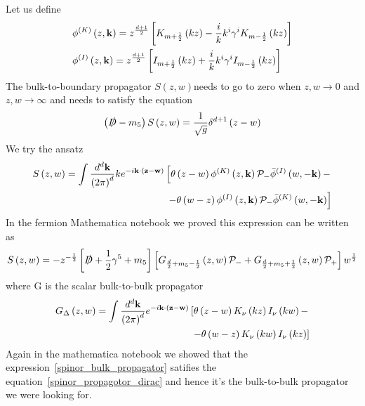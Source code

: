 \documentclass[12pt,a4paper]{article}
\begin{document}
Let us define 
\begin{align}
    &\phi^{\left( K \right)} \left(z, \mathbf{k} \right) = z^{\frac{d+1}{2}} \left[ K_{m+\frac{1}{2}} \left( k z \right) - \frac{i}{k} k^i \gamma^i K_{m-\frac{1}{2}} \left( k z \right)  \right] \\
    &\phi^{\left( I \right)} \left(z, \mathbf{k} \right) = z^{\frac{d+1}{2}} \left[ I_{m+\frac{1}{2}} \left( k z \right) + \frac{i}{k} k^i \gamma^i I_{m-\frac{1}{2}} \left( k z \right)  \right] \notag
\end{align}
The bulk-to-boundary propagator $ S \left(z, w \right) $needs to go to zero when $z, w \rightarrow 0$ and $z, w \rightarrow \infty $ and needs to satisfy the equation
\begin{align}
    \left(\slashed{D} - m_5\right) S\left(z,w\right) = \frac{1}{\sqrt{g}} \delta^{d+1} \left( z - w \right)
\label{spinor_propagotor_dirac}
\end{align}
We try the ansatz
\begin{align}
    S \left(z, w \right) = \int \frac{d^d \mathbf{k}}{{\left(2\pi\right)}^d} k e^{- i \mathbf{k}\cdot \left(\mathbf{z}-\mathbf{w}\right)} \left[ \theta \left( z - w \right)  \phi^{\left( K \right)} \left(z, \mathbf{k} \right) \mathcal{P}_{-} \bar{\phi}^{\left( I \right)} \left(w, -\mathbf{k} \right) - \right. \\  
    \left. - \theta\left( w - z \right) \phi^{\left( I \right)} \left(z, \mathbf{k} \right) \mathcal{P}_{-} \bar{\phi}^{\left( K \right)}\left(w, -\mathbf{k} \right) \right] \notag
\end{align}
In the fermion Mathematica notebook we proved this expression can be written as
\begin{align}
    S \left(z, w \right) = - z^{-\frac{1}{2}} \left[ \slashed{D} + \frac{1}{2}\gamma^5+ m_5 \right] \left[ G_{\frac{d}{2}+m_5 - \frac{1}{2}} \left(z,w\right) \mathcal{P}_{-} + G_{\frac{d}{2}+m_5 +\frac{1}{2}} \left(z,w\right) \mathcal{P}_{+}\right] w^{\frac{1}{2}}
\label{spinor_bulk_propagator}
\end{align}
where G is the scalar bulk-to-bulk propagator
\begin{align}
    G_{\Delta} \left(z, w \right) = \int \frac{d^d \mathbf{k}}{{\left(2\pi\right)}^d}  e^{- i \mathbf{k}\cdot \left(\mathbf{z}-\mathbf{w}\right)} \left[ \theta \left( z - w \right) K_{\nu} \left( k z \right) I_\nu \left( k w \right) - \right. \\  
    \left. - \theta\left( w - z \right) K_{\nu} \left( k w \right) I_\nu \left( k z \right) \right] \notag
\end{align}
Again in the mathematica notebook we showed that the expression~\ref{spinor_bulk_propagator} satifies the equation~\ref{spinor_propagotor_dirac} and hence it's the bulk-to-bulk propagator we were looking for.
\end{document}
